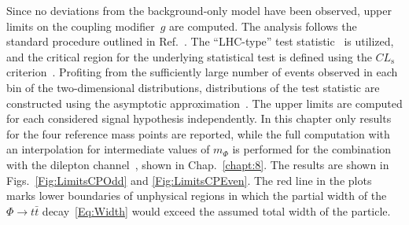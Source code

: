 Since no deviations from the background-only model have been observed, upper limits on the coupling modifier~$g$ are computed.
The analysis follows the standard procedure outlined in Ref.~\cite{CMS-NOTE-2011-005}.
The ``LHC-type'' test statistic~\cite{Cowan:2010js} is utilized, and the critical region for the underlying statistical test is defined using the $CL_\text{s}$ criterion~\cite{Read:2000ru, Read:2002hq, Junk:1999kv}.
Profiting from the sufficiently large number of events observed in each bin of the two-dimensional distributions, distributions of the test statistic are constructed using the asymptotic approximation~\cite{Cowan:2010js}.
The upper limits are computed for each considered signal hypothesis independently.
In this chapter only results for the four reference mass points are reported, while the full computation with an interpolation for intermediate values of $m_\Phi$ is performed for the combination with the dilepton channel~\cite{CMS-AN-17-202}, shown in Chap.~\ref{chapt:8}.
The results are shown in Figs.~\ref{Fig:LimitsCPOdd} and \ref{Fig:LimitsCPEven}.
The red line in the plots marks lower boundaries of unphysical regions in which the partial width of the $\Phi \rightarrow t\bar t$ decay~\eqref{Eq:Width} would exceed the assumed total width of the particle.

